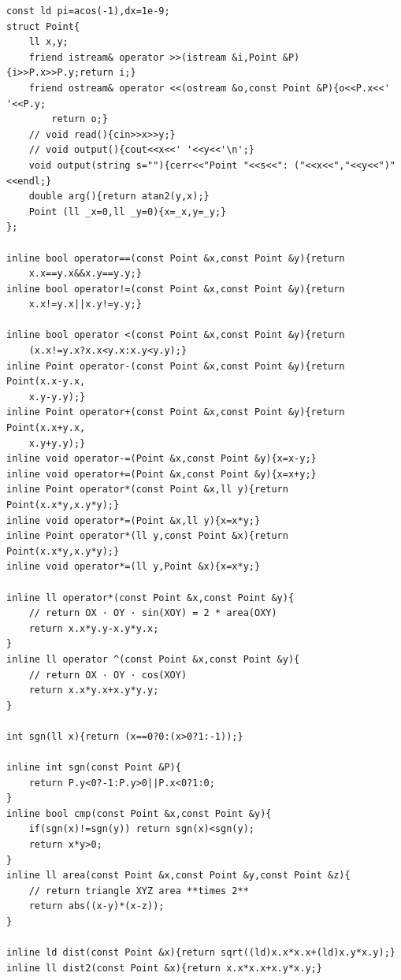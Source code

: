 \documentclass[UTF8,a4paper,10pt]{ctexart}
\begin{document}
\begin{lstlisting}[firstnumber=1]
const ld pi=acos(-1),dx=1e-9;
struct Point{
	ll x,y;
	friend istream& operator >>(istream &i,Point &P){i>>P.x>>P.y;return i;}
	friend ostream& operator <<(ostream &o,const Point &P){o<<P.x<<' '<<P.y;
		return o;}
	// void read(){cin>>x>>y;}
	// void output(){cout<<x<<' '<<y<<'\n';}
	void output(string s=""){cerr<<"Point "<<s<<": ("<<x<<","<<y<<")"<<endl;}
	double arg(){return atan2(y,x);}
	Point (ll _x=0,ll _y=0){x=_x,y=_y;}
};

inline bool operator==(const Point &x,const Point &y){return
	x.x==y.x&&x.y==y.y;}
inline bool operator!=(const Point &x,const Point &y){return
	x.x!=y.x||x.y!=y.y;}

inline bool operator <(const Point &x,const Point &y){return
	(x.x!=y.x?x.x<y.x:x.y<y.y);}
inline Point operator-(const Point &x,const Point &y){return Point(x.x-y.x,
	x.y-y.y);}
inline Point operator+(const Point &x,const Point &y){return Point(x.x+y.x,
	x.y+y.y);}
inline void operator-=(Point &x,const Point &y){x=x-y;}
inline void operator+=(Point &x,const Point &y){x=x+y;}
inline Point operator*(const Point &x,ll y){return Point(x.x*y,x.y*y);}
inline void operator*=(Point &x,ll y){x=x*y;}
inline Point operator*(ll y,const Point &x){return Point(x.x*y,x.y*y);}
inline void operator*=(ll y,Point &x){x=x*y;}

inline ll operator*(const Point &x,const Point &y){
	// return OX · OY · sin(XOY) = 2 * area(OXY)
	return x.x*y.y-x.y*y.x;
}
inline ll operator ^(const Point &x,const Point &y){
	// return OX · OY · cos(XOY)
	return x.x*y.x+x.y*y.y;
}

int sgn(ll x){return (x==0?0:(x>0?1:-1));}

inline int sgn(const Point &P){
	return P.y<0?-1:P.y>0||P.x<0?1:0;
}
inline bool cmp(const Point &x,const Point &y){
	if(sgn(x)!=sgn(y)) return sgn(x)<sgn(y);
	return x*y>0;
}
inline ll area(const Point &x,const Point &y,const Point &z){
	// return triangle XYZ area **times 2**
	return abs((x-y)*(x-z));
}

inline ld dist(const Point &x){return sqrt((ld)x.x*x.x+(ld)x.y*x.y);}
inline ll dist2(const Point &x){return x.x*x.x+x.y*x.y;}


\end{lstlisting}
\end{document}
